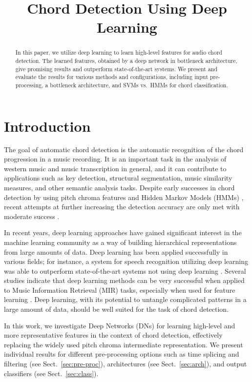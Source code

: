 \documentclass{article}
\title{Chord Detection Using Deep Learning}
\begin{document}
%
\maketitle
%
\begin{abstract}
In this paper, we utilize deep learning to learn high-level features for audio chord detection. The learned features, obtained by a deep network in bottleneck architecture, give promising results and outperform state-of-the-art systems. We present and evaluate the results for various methods and configurations, including input pre-processing, a bottleneck architecture, and SVMs vs.\ HMMs for chord classification. 
\end{abstract}
%
\section{Introduction}
The goal of automatic chord detection is the automatic recognition of the chord progression in a music recording. It is an important task in the analysis of western music and music transcription in general, and it can contribute to applications such as key detection, structural segmentation, music similarity measures, and other semantic analysis tasks. Despite early successes in chord detection by using pitch chroma features \cite{fujishima1999realtime} and Hidden Markov Models (HMMs) \cite{sheh2003chord}, recent attempts at further increasing the detection accuracy are only met with moderate success \cite{ueda2010hmm,cho2013mirex}.

In recent years, deep learning approaches have gained significant interest in the machine learning community as a way of building hierarchical representations from large amounts of data. Deep learning has been applied successfully in various fields; for instance, a system for speech recognition utilizing deep learning was able to outperform state-of-the-art systems not using deep learning \cite{hinton2012deep}. Several studies indicate that deep learning methods can be very successful when applied to Music Information Retrieval (MIR) tasks, especially when used for feature learning \cite{lee2009unsupervised,battenberg2012analyzing,humphrey2012moving,hamel2010learning}. Deep learning, with its potential to untangle complicated patterns in a large amount of data, should be well suited for the task of chord detection.

In this work, we investigate Deep Networks (DNs) for learning high-level and more representative features in the context of chord detection, effectively replacing the widely used pitch chroma intermediate representation. 
We present individual results for different pre-processing options such as time splicing and filtering (see Sect.~\ref{sec:pre-proc}), architectures (see Sect.~\ref{sec:arch}), and output classifiers (see Sect.~\ref{sec:class}). %
\end{document}
